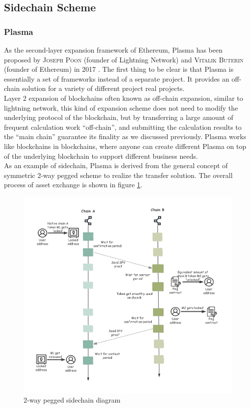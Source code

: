 \subsection{Sidechain Scheme}
\label{sec:side}


\subsubsection{Plasma}
\noindent As the second-layer expansion framework of Ethereum, Plasma has been proposed by \textsc{Joseph Poon} (founder of Lightning Network) and \textsc{Vitalik Buterin} (founder of Ethereum) in 2017 \cite{poon2017plasma}. The first thing to be clear is that Plasma is essentially a set of frameworks instead of a separate project. It provides an off-chain solution for a variety of different project real projects. \\
\noindent Layer 2 expansion of blockchains often known as off-chain expansion, similar to lightning network, this kind of expansion scheme does not need to modify the underlying protocol of the blockchain, but by transferring a large amount of frequent calculation work ``off-chain'', and submitting the calculation results to the ``main chain'' guarantee its finality as we discussed previously. Plasma works like blockchains in blockchains, where anyone can create different Plasma on top of the underlying blockchain to support different business needs. \\
\noindent As an example of sidechain, Plasma is derived from the general concept of symmetric 2-way pegged scheme to realize the transfer solution. The overall process of asset exchange is shown in figure \ref{fig:2way}. 
        \begin{figure}[H]
        \includegraphics[width=1\textwidth]{./figures/2way.png}
        \centering
        \caption{{2-way pegged sidechain diagram}\protect\footnotemark}
        \centering
        \label{fig:2way}
        
        \end{figure}
